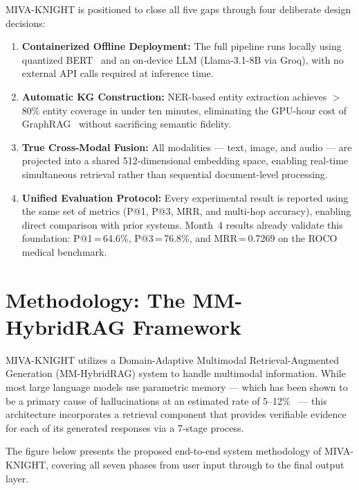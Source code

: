 \documentclass[12pt, a4paper]{article}
\begin{document}
MIVA-KNIGHT is positioned to close all five gaps through four deliberate design
decisions:

\begin{enumerate}[leftmargin=1.5em]
  \item \textbf{Containerized Offline Deployment:} The full pipeline runs
    locally using quantized BERT~\cite{devlin2019bert} and an on-device LLM
    (Llama-3.1-8B via Groq), with no external API calls required at inference
    time.

  \item \textbf{Automatic KG Construction:} NER-based entity extraction
    achieves $>$80\% entity coverage in under ten minutes, eliminating the
    GPU-hour cost of GraphRAG~\cite{edge2024graphrag} without sacrificing
    semantic fidelity.

  \item \textbf{True Cross-Modal Fusion:} All modalities --- text, image, and
    audio --- are projected into a shared 512-dimensional embedding space,
    enabling real-time simultaneous retrieval rather than sequential
    document-level processing.

  \item \textbf{Unified Evaluation Protocol:} Every experimental result is
    reported using the same set of metrics (P@1, P@3, MRR, and multi-hop
    accuracy), enabling direct comparison with prior systems. Month~4 results
    already validate this foundation: P@1\,=\,64.6\%, P@3\,=\,76.8\%, and
    MRR\,=\,0.7269 on the ROCO medical benchmark.
\end{enumerate}

\section{Methodology: The MM-HybridRAG Framework}

MIVA-KNIGHT utilizes a Domain-Adaptive Multimodal
Retrieval-Augmented Generation (MM-HybridRAG) system to handle multimodal
information. While most large language models use parametric memory --- which
has been shown to be a primary cause of hallucinations at an estimated rate of
5--12\%~\cite{zhang2023sirens,ji2023survey} --- this architecture incorporates
a retrieval component that provides verifiable evidence for each of its
generated responses via a 7-stage process.

The figure below presents the proposed end-to-end system methodology of
MIVA-KNIGHT, covering all seven phases from user input through to the final
output layer.
\end{document}
